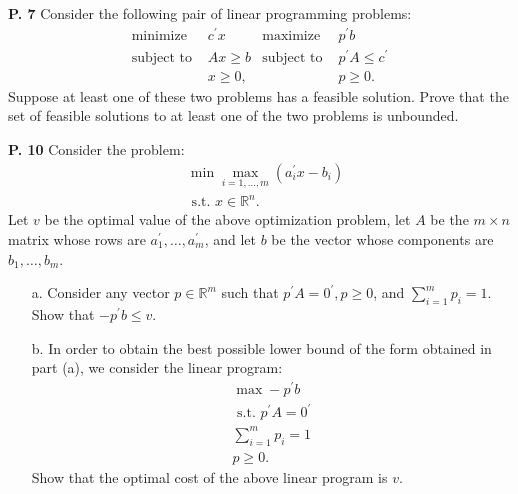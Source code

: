 \documentclass{article}
\begin{document}
\begin{jacklist}
\begin{framed}
    \item [\textbf{P. 7}] Consider the following pair of linear programming problems:
        \begin{align*}
            \text{minimize } & c^{\prime} x & \text{maximize } & p^{\prime} b \\
            \text{subject to } & A x \geq b & \text{subject to } & p^{\prime} A \leq c^{\prime} \\
            & x \geq 0, & & p \geq 0 .
        \end{align*}
        Suppose at least one of these two problems has a feasible solution. Prove that the set of feasible solutions to at least 
        one of the two problems is unbounded.
    \end{framed}
\newpage
    \begin{framed} 
    \item [\textbf{P. 10}] Consider the problem: 
        \begin{align*}
            & \min \max _{i=1, \ldots, m}\left(a_{i}^{\prime} x-b_{i}\right) \\
            & \text { s.t. } x \in \mathbb{R}^{n} .
        \end{align*} Let $v$ be the optimal value of the above optimization problem, let $A$ be the $m \times n$ matrix whose 
        rows are $a_{1}^{\prime}, \ldots, a_{m}^{\prime}$, and let $b$ be the vector whose components are $b_{1}, \ldots, b_{m}$.
        \begin{itemize}
            \item [a.] Consider any vector $p \in \mathbb{R}^{m}$ such that $p^{\prime} A=0^{\prime}, p \geq 0$, and 
                $\sum_{i=1}^{m} p_{i}=1$. Show that $-p^{\prime} b \leq v$.
            \item [b.] In order to obtain the best possible lower bound of the form obtained in part (a), we consider the linear program:
                \begin{align*}
                    \max -p^{\prime} b \\
                    \text { s.t. } p^{\prime} A=0^{\prime} \\
                    \sum_{i=1}^{m} p_{i}=1 \\
                    p \geq 0.
                \end{align*} 
                Show that the optimal cost of the above linear program is $v$. 
        \end{itemize}
    \end{framed}
\end{jacklist}
\end{document}
